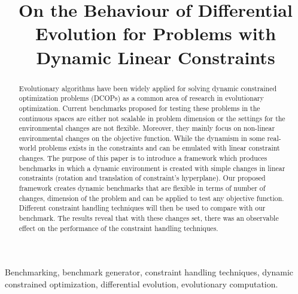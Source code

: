\documentclass[conference]{IEEEtran}
\begin{document}
\title{On the Behaviour of Differential Evolution for Problems with Dynamic Linear Constraints}
\author{
}


\maketitle

\begin{abstract}
Evolutionary algorithms have been widely applied for solving dynamic constrained optimization problems (DCOPs) as a common area of research in evolutionary optimization. Current benchmarks proposed for testing these problems in the continuous spaces are either not scalable in problem dimension or the settings for the environmental changes are not flexible. Moreover, they mainly focus on non-linear environmental changes on the objective function. While the dynamism in some real-world problems exists in the constraints and can be emulated with linear constraint changes. The purpose of this paper is to introduce a framework which produces benchmarks in which a dynamic environment is created with simple changes in linear constraints (rotation and translation of constraint's hyperplane). 
Our proposed framework creates dynamic benchmarks that are flexible in terms of number of changes, dimension of the problem and can be applied to test any objective function. 
Different constraint handling techniques will then be used to compare with our benchmark. 
The results reveal that with these changes set, there was an observable effect on the performance of the constraint handling techniques.
\end{abstract}

\begin{IEEEkeywords}
Benchmarking, benchmark generator, constraint handling techniques, dynamic constrained optimization, 
differential evolution, evolutionary computation.
\end{IEEEkeywords}
\end{document}

